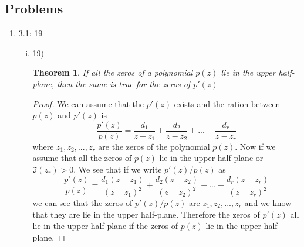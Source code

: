 \documentclass[11pt]{article}
\begin{document}
\subsection*{Problems}

\begin{enumerate}
\item 3.1: 19
\begin{enumerate}[(i)]
\item 19)\\
\newtheorem{theo19a}{Theorem}
\begin{theo19a}
If all the zeros of a polynomial $p(z)$ lie in the upper half-plane, then the same is true for the zeros of $p'(z)$
\end{theo19a}
\begin{proof}
We can assume that the $p'(z)$ exists and the ration between $p(z)$ and $p'(z)$ is
$$\frac{p'(z)}{p(z)} = \frac{d_1}{z-z_1}+\frac{d_2}{z-z_2}+...+\frac{d_r}{z-z_r}$$
where $z_1,z_2,...,z_r$ are the zeros of the polynomial $p(z)$. Now if we assume that all the zeros of $p(z)$ lie in the upper half-plane or $\Im (z_r)>0$. We see that if we write $p'(z)/p(z)$ as
$$\frac{p'(z)}{p(z)} = \frac{d_1(z-z_1)}{(z-z_1)^2}+\frac{d_2(z-z_2)}{(z-z_2)^2}+...+\frac{d_r(z-z_r)}{(z-z_r)^2}$$
we can see that the zeros of $p'(z)/p(z)$ are $z_1,z_2,...,z_r$ and we know that they are lie in the upper half-plane. Therefore the zeros of $p'(z)$ all lie in the upper half-plane if the zeros of $p(z)$ lie in the upper half-plane.
\end{proof}


\end{enumerate}
\end{enumerate}
\end{document}
